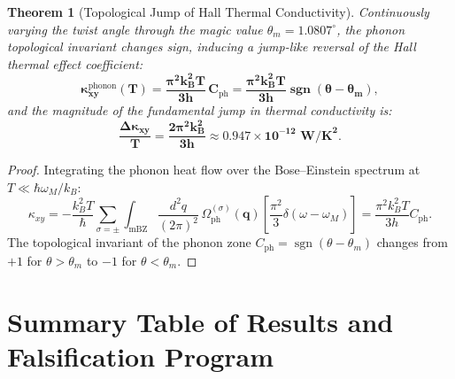 \documentclass[12pt,a4paper]{article}
\newtheorem{theorem}{Theorem}
\begin{document}
\begin{theorem}[Topological Jump of Hall Thermal Conductivity]
Continuously varying the twist angle through the magic value $\theta_m = 1.0807^\circ$, the phonon topological invariant changes sign, inducing a jump-like reversal of the Hall thermal effect coefficient:
\begin{equation}
\mathbf{\kappa_{xy}^{\mathrm{phonon}}(T) = \frac{\pi^2 k_B^2 T}{3 h} \, C_{\mathrm{ph}} = \frac{\pi^2 k_B^2 T}{3 h} \operatorname{sgn}(\theta - \theta_m)},
\end{equation}
and the magnitude of the fundamental jump in thermal conductivity is:
\begin{equation}
\mathbf{\frac{\Delta \kappa_{xy}}{T} = \frac{2\pi^2 k_B^2}{3 h} \approx \mathbf{0.947 \times 10^{-12}\text{ W/K}^2}}.
\end{equation}
\end{theorem}
												
\begin{proof}
Integrating the phonon heat flow over the Bose--Einstein spectrum at $T \ll \hbar \omega_M / k_B$:
\begin{equation}
\kappa_{xy} = -\frac{k_B^2 T}{\hbar} \sum_{\sigma=\pm} \int_{\text{mBZ}} \frac{d^2q}{(2\pi)^2} \, \Omega_{\text{ph}}^{(\sigma)}(\mathbf{q}) \left[ \frac{\pi^2}{3} \delta(\omega - \omega_M) \right] = \frac{\pi^2 k_B^2 T}{3 h} C_{\text{ph}}.
\end{equation}
The topological invariant of the phonon zone $C_{\text{ph}} = \operatorname{sgn}(\theta - \theta_m)$ changes from $+1$ for $\theta > \theta_m$ to $-1$ for $\theta < \theta_m$.
\end{proof}
												
\section{Summary Table of Results and Falsification Program}
												
\end{document}
